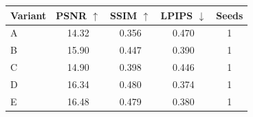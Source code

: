 \begin{tabular}{lcccc}
\toprule
Variant & PSNR $\uparrow$ & SSIM $\uparrow$ & LPIPS $\downarrow$ & Seeds \\
\midrule
A & 14.32 & 0.356 & 0.470 & 1 \\
B & 15.90 & 0.447 & 0.390 & 1 \\
C & 14.90 & 0.398 & 0.446 & 1 \\
D & 16.34 & 0.480 & 0.374 & 1 \\
E & 16.48 & 0.479 & 0.380 & 1 \\
\bottomrule
\end{tabular}
